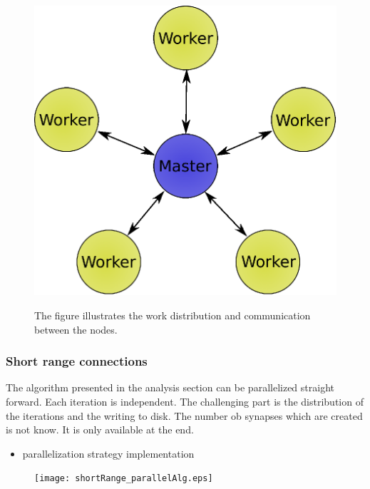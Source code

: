 \documentclass[a4paper]{article}
\begin{document}
\begin{figure}[ht!]
\begin{center}
{            \includegraphics[scale=0.5]{MasterWorker.eps}
       }
    	   \end{center}
    	\caption{%
        The figure illustrates the work distribution and communication between the nodes.
     }%
   \label{fig:atlas}
   \end{figure}

\newpage
\subsubsection{Short range connections}

The algorithm presented in the analysis section can be parallelized straight forward.
Each iteration is independent. The challenging part is the distribution of the iterations and
the writing to disk. The number ob synapses which are created is not know. It is only available
at the end.


\begin{itemize}
      \item parallelization strategy implementation
\end{itemize}


\begin{figure}[ht!]
\centering
\texttt{[image: shortRange\_parallelAlg.eps]}
\end{figure}
\end{document}
